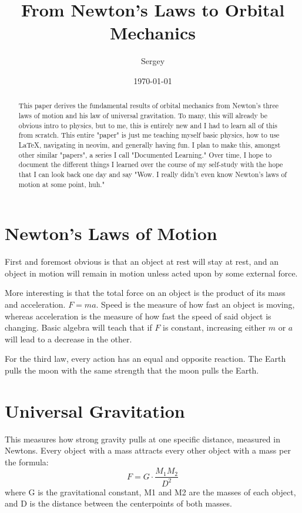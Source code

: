 \documentclass[12pt]{article}
\title{From Newton's Laws to Orbital Mechanics}
\author {Sergey}
\date{\today}
\begin{document}
\maketitle

\begin{abstract}
This paper derives the fundamental results of orbital mechanics
from Newton's three laws of motion and his law of universal gravitation. To many, this will already be obvious intro to physics, but to me, this is entirely new and I had
to learn all of this from scratch. This entire "paper" is just me teaching myself basic physics, how to use LaTeX, navigating in neovim, and generally having fun. 
I plan to make this, amongst other similar "papers", a series I call "Documented Learning." Over time, I hope to document the different things I learned over the course 
of my self-study with the hope that I can look back one day and say "Wow. I really didn't even know Newton's laws of motion at some point, huh."
\end{abstract}

\newpage
\section{Newton's Laws of Motion}
First and foremost obvious is that an object at rest will stay at rest, and an object in motion will remain in motion unless acted upon by some external force. 

More interesting is that the total force on an object is the product of its mass and acceleration. $F = ma$. Speed is the measure of how fast an object is moving, 
whereas acceleration is the measure of how fast the speed of said object is changing.
Basic algebra will teach that if $F$ is constant, increasing either $m$ or $a$ will lead to a decrease in the other.

For the third law, every action has an equal and opposite reaction. The Earth pulls the moon with the same strength that the moon pulls the Earth. 

\section{Universal Gravitation}
This measures how strong gravity pulls at one specific distance, measured in Newtons. Every object with a mass attracts every other object with a mass 
per the formula: $$F = G \cdot \frac{M_1 M_2}{D^2}$$ where G is the gravitational constant, M1 and M2 are the masses of each object, and D is the distance 
between the centerpoints of both masses. 
\end{document}
